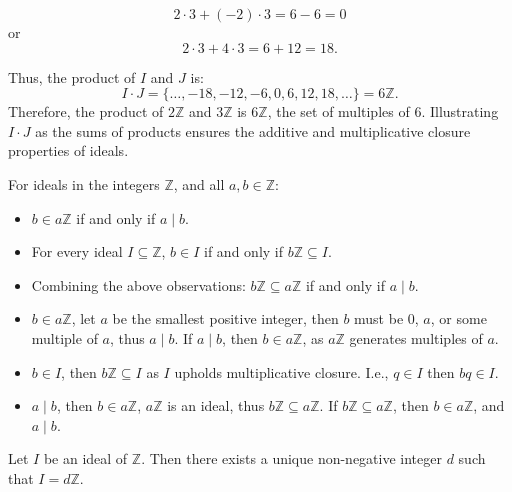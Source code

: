 \[
    2 \cdot 3 + (-2) \cdot 3 = 6 - 6 = 0
\]
or
\[
    2 \cdot 3 + 4 \cdot 3 = 6 + 12 = 18.
\]

Thus, the product of $I$ and $J$ is:
\[
    I \cdot J = \{ \ldots, -18, -12, -6, 0, 6, 12, 18, \ldots \} = 6\mathbb{Z}.
\]
Therefore, the product of $2\mathbb{Z}$ and $3\mathbb{Z}$ is $6\mathbb{Z}$, the set of multiples of 6.
Illustrating $I \cdot J$ as the sums of products ensures the additive and multiplicative closure properties of ideals.

\newpage

\begin{theo}

    \label{theo:ideal_properties}

    For ideals in the integers $\mathbb{Z}$, and all $a, b \in \mathbb{Z}$:
    \begin{itemize}
        \item $b \in a\mathbb{Z}$ if and only if $a \mid b$.
        \item For every ideal $I \subseteq \mathbb{Z}$, $b \in I$ if and only if $b\mathbb{Z} \subseteq I$.
        \item Combining the above observations: $b\mathbb{Z} \subseteq a\mathbb{Z}$ if and only if $a \mid b$.
    \end{itemize}
\end{theo}

\begin{Proof}

    \begin{itemize}
        \item $b \in a\mathbb{Z}$, let $a$ be the smallest positive integer, then $b$ must be 0, $a$, or some
        multiple of $a$, thus $a \mid b$. If $a\mid b$, then $b\in a\mathbb{Z}$, as $a\mathbb{Z}$ generates multiples of $a$.
        \item $b \in I$, then $b\mathbb{Z} \subseteq I$ as $I$ upholds multiplicative closure. I.e., $q\in I$ then $bq\in I$.
        \item $a\mid b$, then $b\in a\mathbb{Z}$, $a\mathbb{Z}$ is an ideal, thus $b\mathbb{Z} \subseteq a\mathbb{Z}$. If $b\mathbb{Z} \subseteq a\mathbb{Z}$, then $b\in a\mathbb{Z}$, and $a\mid b$.
    \end{itemize}
\end{Proof}


\begin{theo}

    \label{theo:ideal_generator}

    Let \( I \) be an ideal of \( \mathbb{Z} \). Then there exists a unique non-negative integer \( d \) such that \( I = d\mathbb{Z} \).
\end{theo}

